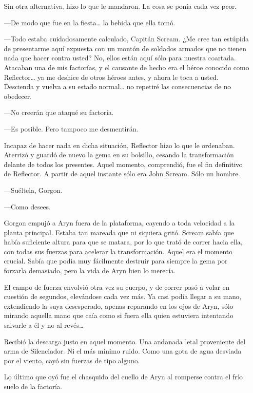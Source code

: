 Sin otra alternativa, hizo lo que le mandaron. La cosa se ponía cada vez peor.

---De modo que fue en la fiesta\dots{} la bebida que ella tomó.

---Todo estaba cuidadosamente calculado, Capitán Scream. ¿Me cree tan estúpida de presentarme aquí expuesta con un montón de soldados armados que no tienen nada que hacer contra usted? No, ellos están aquí sólo para nuestra coartada. Atacaban una de mis factorías, y el causante de hecho era el héroe conocido como Reflector\dots{} ya me deshice de otros héroes antes, y ahora le toca a usted. Descienda y vuelva a su estado normal\dots{} no repetiré las consecuencias de no obedecer.

---No creerán que ataqué su factoría.

---Es posible. Pero tampoco me desmentirán.

Incapaz de hacer nada en dicha situación, Reflector hizo lo que le ordenaban. Aterrizó y guardó de nuevo la gema en su bolsillo, cesando la transformación delante de todos los presentes. Aquel momento, comprendió, fue el fin definitivo de Reflector. A partir de aquel instante sólo era John Scream. Sólo un hombre.

---Suéltela, Gorgon.

---Como desees.

Gorgon empujó a Aryn fuera de la plataforma, cayendo a toda velocidad a la planta principal. Estaba tan mareada que ni siquiera gritó. Scream sabía que había suficiente altura para que se matara, por lo que trató de correr hacia ella, con todas sus fuerzas para acelerar la transformación. Aquel era el momento crucial. Sabía que podía muy fácilmente destruir para siempre la gema por forzarla demasiado, pero la vida de Aryn bien lo merecía.

El campo de fuerza envolvió otra vez su cuerpo, y de correr pasó a volar en cuestión de segundos, elevándose cada vez más. Ya casi podía llegar a su mano, extendiendo la suya desesperado, apenas reparando en los ojos de Aryn, sólo mirando aquella mano que caía como si fuera ella quien estuviera intentando salvarle a él y no al revés\dots

Recibió la descarga justo en aquel momento. Una andanada letal proveniente del arma de Silenciador. Ni el más mínimo ruido. Como una gota de agua desviada por el viento, cayó sin fuerzas de tipo alguno.

Lo último que oyó fue el chasquido del cuello de Aryn al romperse contra el frío suelo de la factoría.

